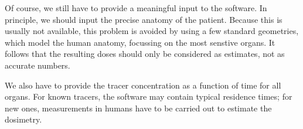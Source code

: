 Of course, we still have to provide a meaningful input to the
software. In principle, we should input the precise anatomy of the
patient. Because this is usually not available, this problem is
avoided by using a few standard geometries, which model the human
anatomy, focussing on the most senstive organs. It follows that the
resulting doses should only be considered as estimates, not as
accurate numbers.

We also have to provide the tracer concentration as a function of time
for all organs.  For known tracers, the software may contain typical
residence times; for new ones, measurements in humans have to be
carried out to estimate the dosimetry.
